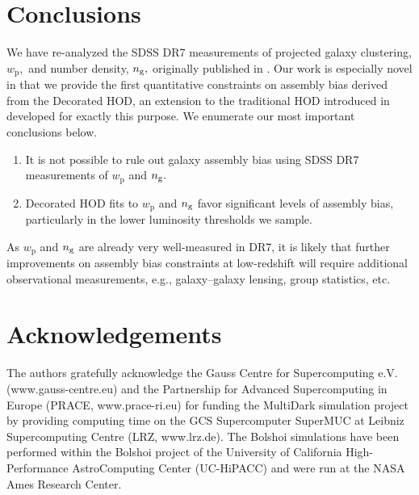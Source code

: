 \documentclass[usenatbib,usegraphicx,letterpaper]{mn2e}
\newcommand{\wprp}{w_{\mathrm{p}}}
\newcommand{\ben}{\begin{enumerate}}
\newcommand{\een}{\end{enumerate}}
\begin{document}


\section{Conclusions}
\label{section:conclusions}

We have re-analyzed the SDSS DR7 measurements of projected galaxy clustering,  $\wprp,$ and number density, $n_{\rm g},$ originally published in \citet{zehavi_etal11}. Our work is especially novel in that we provide the first quantitative constraints on assembly bias derived from the Decorated HOD, an extension to the traditional HOD introduced in \citet{hearin_etal16} developed for exactly this purpose. 
We enumerate our most important conclusions below. 
\ben
\item It is not possible to rule out galaxy assembly bias using SDSS DR7 measurements of $\wprp$ and $n_{\rm g}.$
\item Decorated HOD fits to $\wprp$ and $n_{\rm g}$ favor significant levels of assembly bias, particularly in the lower luminosity thresholds we sample. 
\een
As $\wprp$ and $n_{\rm g}$ are already very well-measured in DR7, it is likely that further improvements on assembly bias constraints at low-redshift will require additional observational measurements, e.g., galaxy--galaxy lensing, group statistics, etc.

\section{Acknowledgements}
\label{section:acknowledgements}

The authors gratefully acknowledge the Gauss Centre for Supercomputing e.V. (www.gauss-centre.eu) and the Partnership for Advanced Supercomputing in Europe (PRACE, www.prace-ri.eu) for funding the MultiDark simulation project by providing computing time on the GCS Supercomputer SuperMUC at Leibniz Supercomputing Centre (LRZ, www.lrz.de). The Bolshoi simulations have been performed within the Bolshoi project of the University of California High-Performance AstroComputing Center (UC-HiPACC) and were run at the NASA Ames Research Center.




\end{document}
